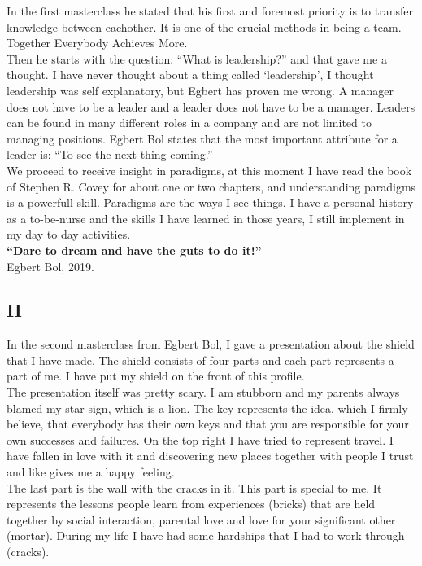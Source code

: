 \documentclass{article}
\begin{document}
In the first masterclass he stated that his first and foremost priority is to transfer knowledge between eachother. It is one of the crucial methods in being a team. Together Everybody Achieves More. \\

Then he starts with the question: ``What is leadership?'' and that gave me a thought. I have never thought about a thing called `leadership', I thought leadership was self explanatory, but Egbert has proven me wrong. A manager does not have to be a leader and a leader does not have to be a manager. Leaders can be found in many different roles in a company and are not limited to managing positions. Egbert Bol states that the most important attribute for a leader is: ``To see the next thing coming.''\\ 

We proceed to receive insight in paradigms, at this moment I have read the book of Stephen R. Covey for about one or two chapters, and understanding paradigms is a powerfull skill. Paradigms are the ways I see things. I have a personal history as a to-be-nurse and the skills I have learned in those years, I still implement in my day to day activities. \\

\textbf{``Dare to dream and have the guts to do it!''} \\
Egbert Bol, 2019.

\subsection{II}
In the second masterclass from Egbert Bol, I gave a presentation about the shield that I have made. The shield consists of four parts and each part represents a part of me. I have put my shield on the front of this profile.\\

The presentation itself was pretty scary. I am stubborn and my parents always blamed my star sign, which is a lion. The key represents the idea, which I firmly believe, that everybody has their own keys and that you are responsible for your own successes and failures. On the top right I have tried to represent travel. I have fallen in love with it and discovering new places together with people I trust and like gives me a happy feeling. \\

The last part is the wall with the cracks in it. This part is special to me. It represents the lessons people learn from experiences (bricks) that are held together by social interaction, parental love and love for your significant other (mortar). During my life I have had some hardships that I had to work through (cracks).\\
\end{document}
